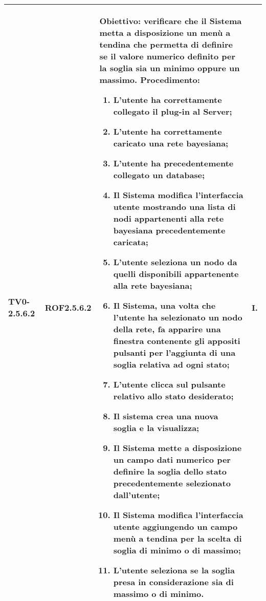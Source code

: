 \begin{longtable}{|C{.15\textwidth}|C{.13\textwidth}|m{.52\textwidth}|C{.08\textwidth}|}
TV0-2.5.6.2 & ROF2.5.6.2 &
	\textbf{Obiettivo}: verificare che il Sistema metta a disposizione un menù a tendina che permetta di definire se il valore numerico definito per la soglia sia un minimo oppure un massimo. \newline
	\textbf{Procedimento}:
	\begin{enumerate}
		\item L'utente ha correttamente collegato il plug-in al Server;
		\item L'utente ha correttamente caricato una rete bayesiana;
		\item L'utente ha precedentemente collegato un database;
		\item Il Sistema modifica l'interfaccia utente mostrando una lista di nodi appartenenti alla rete bayesiana precedentemente caricata;
		\item L'utente seleziona un nodo da quelli disponibili appartenente alla rete bayesiana;
		\item Il Sistema, una volta che l'utente ha selezionato un nodo della rete, fa apparire una finestra contenente gli appositi pulsanti per l'aggiunta di una soglia relativa ad ogni stato;
		\item L'utente clicca sul pulsante relativo allo stato desiderato;
		\item Il sistema crea una nuova soglia e la visualizza;
		\item Il Sistema mette a disposizione un campo dati numerico per definire la soglia dello stato precedentemente selezionato dall'utente;
		\item Il Sistema modifica l'interfaccia utente aggiungendo un campo menù a tendina per la scelta di soglia di minimo o di massimo;
		\item L'utente seleziona se la soglia presa in considerazione sia di massimo o di minimo.
	\end{enumerate}
	& I. \\
\hline


\end{longtable}
